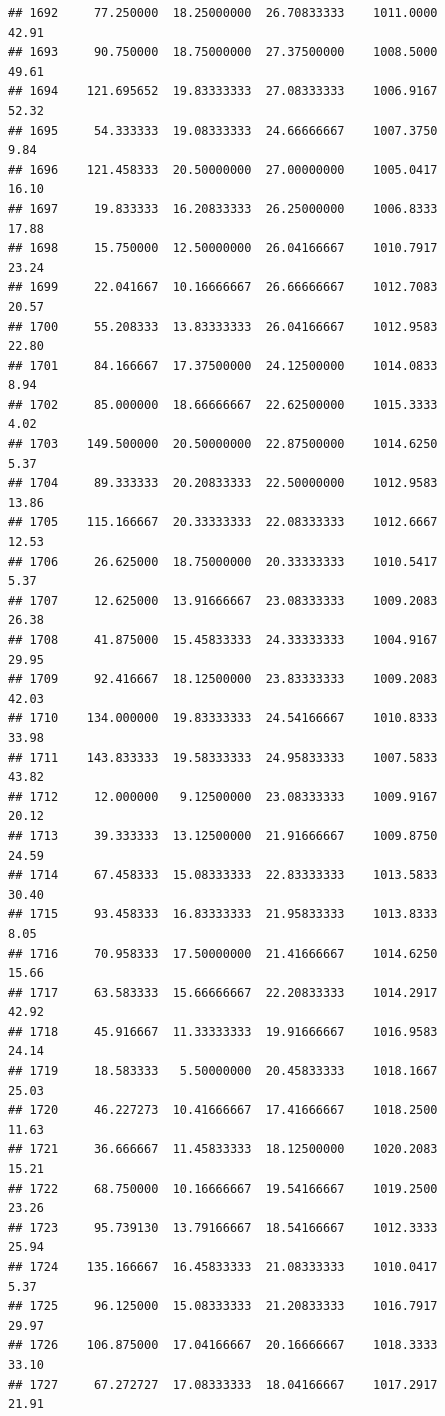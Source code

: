 \documentclass[
]{article}
\begin{document}
\begin{verbatim}
## 1692     77.250000  18.25000000  26.70833333    1011.0000       42.91
## 1693     90.750000  18.75000000  27.37500000    1008.5000       49.61
## 1694    121.695652  19.83333333  27.08333333    1006.9167       52.32
## 1695     54.333333  19.08333333  24.66666667    1007.3750        9.84
## 1696    121.458333  20.50000000  27.00000000    1005.0417       16.10
## 1697     19.833333  16.20833333  26.25000000    1006.8333       17.88
## 1698     15.750000  12.50000000  26.04166667    1010.7917       23.24
## 1699     22.041667  10.16666667  26.66666667    1012.7083       20.57
## 1700     55.208333  13.83333333  26.04166667    1012.9583       22.80
## 1701     84.166667  17.37500000  24.12500000    1014.0833        8.94
## 1702     85.000000  18.66666667  22.62500000    1015.3333        4.02
## 1703    149.500000  20.50000000  22.87500000    1014.6250        5.37
## 1704     89.333333  20.20833333  22.50000000    1012.9583       13.86
## 1705    115.166667  20.33333333  22.08333333    1012.6667       12.53
## 1706     26.625000  18.75000000  20.33333333    1010.5417        5.37
## 1707     12.625000  13.91666667  23.08333333    1009.2083       26.38
## 1708     41.875000  15.45833333  24.33333333    1004.9167       29.95
## 1709     92.416667  18.12500000  23.83333333    1009.2083       42.03
## 1710    134.000000  19.83333333  24.54166667    1010.8333       33.98
## 1711    143.833333  19.58333333  24.95833333    1007.5833       43.82
## 1712     12.000000   9.12500000  23.08333333    1009.9167       20.12
## 1713     39.333333  13.12500000  21.91666667    1009.8750       24.59
## 1714     67.458333  15.08333333  22.83333333    1013.5833       30.40
## 1715     93.458333  16.83333333  21.95833333    1013.8333        8.05
## 1716     70.958333  17.50000000  21.41666667    1014.6250       15.66
## 1717     63.583333  15.66666667  22.20833333    1014.2917       42.92
## 1718     45.916667  11.33333333  19.91666667    1016.9583       24.14
## 1719     18.583333   5.50000000  20.45833333    1018.1667       25.03
## 1720     46.227273  10.41666667  17.41666667    1018.2500       11.63
## 1721     36.666667  11.45833333  18.12500000    1020.2083       15.21
## 1722     68.750000  10.16666667  19.54166667    1019.2500       23.26
## 1723     95.739130  13.79166667  18.54166667    1012.3333       25.94
## 1724    135.166667  16.45833333  21.08333333    1010.0417        5.37
## 1725     96.125000  15.08333333  21.20833333    1016.7917       29.97
## 1726    106.875000  17.04166667  20.16666667    1018.3333       33.10
## 1727     67.272727  17.08333333  18.04166667    1017.2917       21.91

\end{verbatim}
\end{document}

